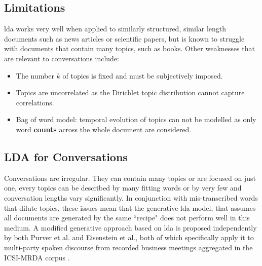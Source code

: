     \subsection{Limitations}
    \gls{lda} works very well when applied to similarly structured, similar length documents such as news articles\cite{blei2003latent, newman2006probabilistic} or scientific papers\cite{griffiths2004finding, wang2011collaborative}, but is known to struggle with documents that contain many topics, such as books\cite{tang2014understanding}. Other weaknesses that are relevant to conversations include:
    \begin{itemize}
        \item The number $k$ of topics is fixed and must be subjectively imposed.
        \item Topics are uncorrelated as the Dirichlet topic distribution cannot capture correlations.
        \item Bag of word \gls{model}: temporal evolution of topics can not be modelled as only word \textbf{counts} across the whole document are considered.
    \end{itemize}

    \subsection{LDA for Conversations \label{sssec: lda for conversations}}
    Conversations are irregular. They can contain many topics or are focused on just one, every topics can be described by many fitting words or by very few and conversation lengths vary significantly. In conjunction with mis-transcribed words that dilute topics, these issues mean that the generative \gls{lda} \gls{model}, that assumes all documents are generated by the same ``recipe" does not perform well in this medium\cite{purver2006unsupervised, tang2014understanding}. A modified generative approach based on \gls{lda} is proposed independently by both Purver et al.\cite{purver2006unsupervised} and Eisenstein et al.\cite{eisenstein2008bayesian}, both of which specifically apply it to multi-party spoken discourse from recorded business meetings aggregated in the ICSI-MRDA corpus \cite{shriberg2004icsi}. \newline
